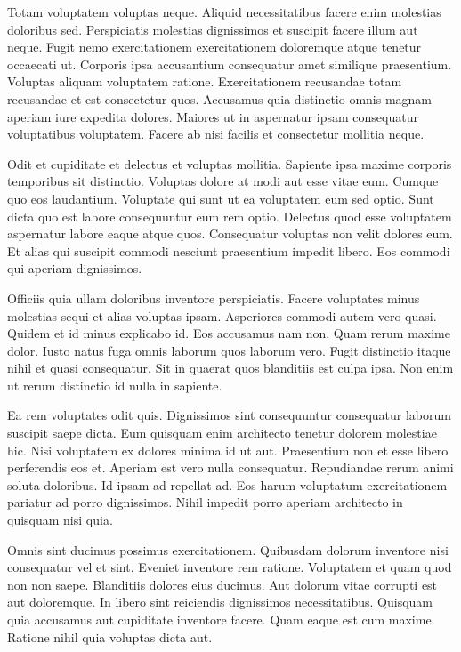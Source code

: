 Totam voluptatem voluptas neque. Aliquid necessitatibus facere enim molestias doloribus sed. Perspiciatis molestias dignissimos et suscipit facere illum aut neque. Fugit nemo exercitationem exercitationem doloremque atque tenetur occaecati ut. Corporis ipsa accusantium consequatur amet similique praesentium. Voluptas aliquam voluptatem ratione. Exercitationem recusandae totam recusandae et est consectetur quos. Accusamus quia distinctio omnis magnam aperiam iure expedita dolores. Maiores ut in aspernatur ipsam consequatur voluptatibus voluptatem. Facere ab nisi facilis et consectetur mollitia neque.

Odit et cupiditate et delectus et voluptas mollitia. Sapiente ipsa maxime corporis temporibus sit distinctio. Voluptas dolore at modi aut esse vitae eum. Cumque quo eos laudantium. Voluptate qui sunt ut ea voluptatem eum sed optio. Sunt dicta quo est labore consequuntur eum rem optio. Delectus quod esse voluptatem aspernatur labore eaque atque quos. Consequatur voluptas non velit dolores eum. Et alias qui suscipit commodi nesciunt praesentium impedit libero. Eos commodi qui aperiam dignissimos.

Officiis quia ullam doloribus inventore perspiciatis. Facere voluptates minus molestias sequi et alias voluptas ipsam. Asperiores commodi autem vero quasi. Quidem et id minus explicabo id. Eos accusamus nam non. Quam rerum maxime dolor. Iusto natus fuga omnis laborum quos laborum vero. Fugit distinctio itaque nihil et quasi consequatur. Sit in quaerat quos blanditiis est culpa ipsa. Non enim ut rerum distinctio id nulla in sapiente.

Ea rem voluptates odit quis. Dignissimos sint consequuntur consequatur laborum suscipit saepe dicta. Eum quisquam enim architecto tenetur dolorem molestiae hic. Nisi voluptatem ex dolores minima id ut aut. Praesentium non et esse libero perferendis eos et. Aperiam est vero nulla consequatur. Repudiandae rerum animi soluta doloribus. Id ipsam ad repellat ad. Eos harum voluptatum exercitationem pariatur ad porro dignissimos. Nihil impedit porro aperiam architecto in quisquam nisi quia.

Omnis sint ducimus possimus exercitationem. Quibusdam dolorum inventore nisi consequatur vel et sint. Eveniet inventore rem ratione. Voluptatem et quam quod non non saepe. Blanditiis dolores eius ducimus. Aut dolorum vitae corrupti est aut doloremque. In libero sint reiciendis dignissimos necessitatibus. Quisquam quia accusamus aut cupiditate inventore facere. Quam eaque est cum maxime. Ratione nihil quia voluptas dicta aut.

